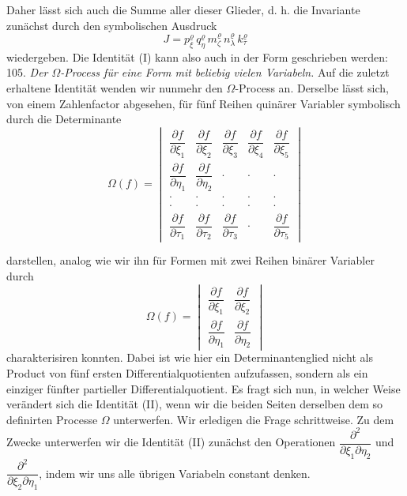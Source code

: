 Daher lässt sich auch die Summe aller dieser Glieder, d. h. die Invariante zunächst durch den symbolischen Ausdruck
\[
J = p_\xi^\varrho\, q_\eta^\varrho\, m_\zeta^\varrho\, n_\lambda^\varrho\, k_\tau^\varrho
\]
wiedergeben. Die Identität (I) kann also auch in der Form geschrieben werden:
105. \textit{Der $\Omega$-Process für eine Form mit beliebig vielen Variabeln.} Auf die zuletzt erhaltene Identität wenden wir nunmehr den $\Omega$-Process an. Derselbe lässt sich, von einem Zahlenfactor abgesehen, für fünf Reihen quinärer Variabler symbolisch durch die Determinante
\[
\Omega(f) =
\begin{vmatrix}
\dfrac{\partial f}{\partial \xi_1} & \dfrac{\partial f}{\partial \xi_2} & \dfrac{\partial f}{\partial \xi_3} & \dfrac{\partial f}{\partial \xi_4} & \dfrac{\partial f}{\partial \xi_5}\\[6pt]
\dfrac{\partial f}{\partial \eta_1} & \dfrac{\partial f}{\partial \eta_2} & \cdot & \cdot & \cdot\\[6pt]
\cdot & \cdot & \cdot & \cdot & \cdot\\[6pt]
\cdot & \cdot & \cdot & \cdot & \cdot\\[6pt]
\dfrac{\partial f}{\partial \tau_1} & \dfrac{\partial f}{\partial \tau_2} & \dfrac{\partial f}{\partial \tau_3} & \cdot & \dfrac{\partial f}{\partial \tau_5}
\end{vmatrix}
\]


darstellen, analog wie wir ihn für Formen mit zwei Reihen binärer Variabler durch
\[
\Omega(f) =
\begin{vmatrix}
\dfrac{\partial f}{\partial \xi_1} & \dfrac{\partial f}{\partial \xi_2}\\[6pt]
\dfrac{\partial f}{\partial \eta_1} & \dfrac{\partial f}{\partial \eta_2}
\end{vmatrix}
\]
charakterisiren konnten. Dabei ist wie hier ein Determinantenglied nicht als Product von fünf ersten Differentialquotienten aufzufassen, sondern als ein einziger fünfter partieller Differentialquotient. Es fragt sich nun, in welcher Weise verändert sich die Identität (II), wenn wir die beiden Seiten derselben dem so definirten Processe $\Omega$ unterwerfen. Wir erledigen die Frage schrittweise. Zu dem Zwecke unterwerfen wir die Identität (II) zunächst den Operationen $\dfrac{\partial^2}{\partial \xi_1 \partial \eta_2}$ und $\dfrac{\partial^2}{\partial \xi_2 \partial \eta_1}$, indem wir uns alle übrigen Variabeln constant denken.

